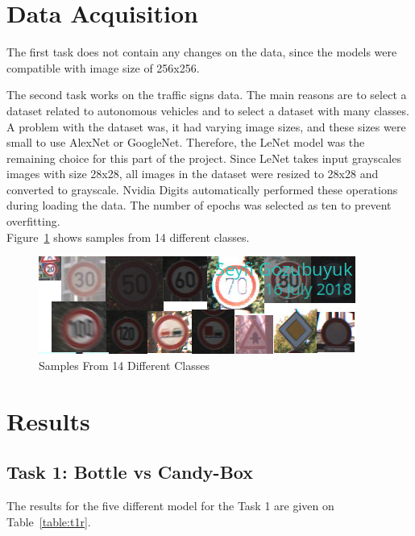 \documentclass[10pt,journal,compsoc]{IEEEtran}
\begin{document}
\section{Data Acquisition}
The first task does not contain any changes on the data, since the models were compatible with image size of 256x256.


The second task works on the traffic signs data. The main reasons are to select a dataset related to autonomous vehicles and to select a dataset with many classes. A problem with the dataset was, it had varying image sizes, and these sizes were small to use AlexNet or GoogleNet. Therefore, the LeNet model was the remaining choice for this part of the project. Since LeNet takes input grayscales images with size 28x28, all images in the dataset were resized to 28x28 and converted to grayscale. Nvidia Digits automatically performed these operations during loading the data. The number of epochs was selected as ten to prevent overfitting.\\
Figure~\ref{fig:tss14} shows samples from 14 different classes.
\begin{figure}[thpb]
      \centering
      \includegraphics[width=\linewidth]{figures/Tsignsamples14.png}
      \caption{Samples From 14 Different Classes}
      \label{fig:tss14}
\end{figure}

\section{Results}
\subsection{Task 1: Bottle vs Candy-Box}
The results for the five different model for the Task 1 are given on Table~\ref{table:t1r}.
\end{document}
